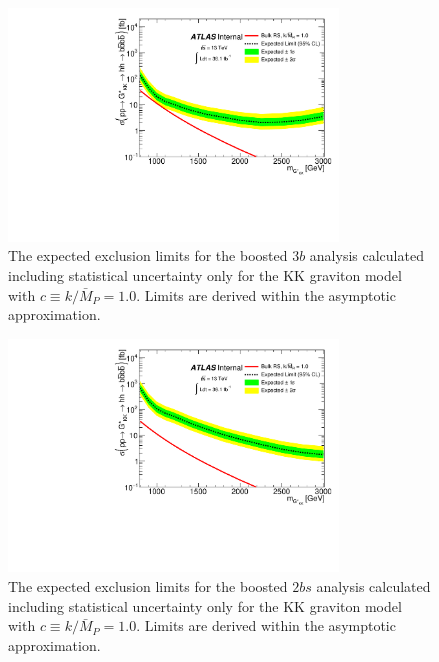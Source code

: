 \begin{figure}
\begin{center}
\includegraphics[width=0.78\textwidth,angle=-90]{figures/boosted/Limit_Stat/BrazilPlot_Asymptotic_RSGC10_merged_3b.pdf}
\caption{The expected exclusion limits for the boosted $3b$ analysis calculated including statistical uncertainty only
for the KK graviton model with $c \equiv k/\bar{M}_P = 1.0$. Limits are derived within the asymptotic approximation.}
\label{fig:brazil_hh_boosted_3b_c10_stat}
\end{center}
\end{figure}

\begin{figure}
\begin{center}
\includegraphics[width=0.78\textwidth,angle=-90]{figures/boosted/Limit_Stat/BrazilPlot_Asymptotic_RSGC10_merged_2b.pdf}
\caption{The expected exclusion limits for the boosted $2bs$ analysis calculated including statistical uncertainty only
for the KK graviton model with $c \equiv k/\bar{M}_P = 1.0$. Limits are derived within the asymptotic approximation.}
\label{fig:brazil_hh_boosted_2b_c10_stat}
\end{center}
\end{figure}


